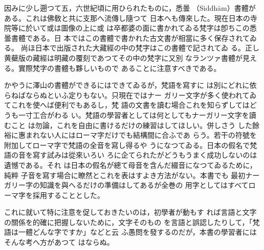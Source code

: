 \numberParagraph
因みに少し遡つて五，六世紀頃に用ひられたものに，悉曇
（Siddhām）書體がある。これは佛敎と共に支那へ流傳し隨つて
日本へも傳來した。現在日本の寺院等に於いて或は圖像の上に或
は卒都婆の面に書かれてゐる梵字は卽ちこの悉曇書體である。日
本ではこの書體で書かれた古文書が相當に多く保存されてゐる。
尚ほ日本で出版された大藏經の中の梵字はこの書體で記されてゐ
る。正し黄蘗版の藏經は明藏の覆刻であつてその中の梵字に又別
なランツァ書體が見える。實際梵字の書體も夥しいもので
あることに注意すべきである。

かやうに澤山の書體ができるにはできてゐるが，梵語を寫すに
は別にどれに依らねばならぬといふ定りもない。只現在ではナー
ガリー文字が多く使われてゐてこれを使へば便利でもあるし，梵
語の文書を讀む場合これを知らずしてはどうも一寸工合がわる
い。梵語の學習者としては何としてもナーガリー文字を讀むこと
は勿論，これを自由に書けるだけの練習はしてほしい。併しさう
した餘裕に惠まれない人にはローマ字だけでも結構間に合ふであ
らう。若干の符號を附加してローマ字で梵語の全音を寫し得るや
うになつてゐる。日本の假名で梵語の音を寫す試みは從來いろい
ろに企てられたがどうもうまく成功しないのは遺憾である。それ
は日本の假名が總て母音を含んだ綴音になつてゐるために，純粹
子音を寫す場合に瞭然とこれを表はすよき方法がない。本書でも
最初ナーガリー字の知識を與へるだけの準備はしてあるが全巻の
用字としてはすべてローマ字を採用することとした。

これに就いて特に注意を促しておきたいのは，初學者が動もす
れば言語と文字の關係を的確に把握しないために，文字そのもの
を言語と誤認したりして，「梵語は一體どんな字ですか」などと云
ふ愚問を發するのだが，本書の學習者にはそんな考へ方があつて
はならぬ。


